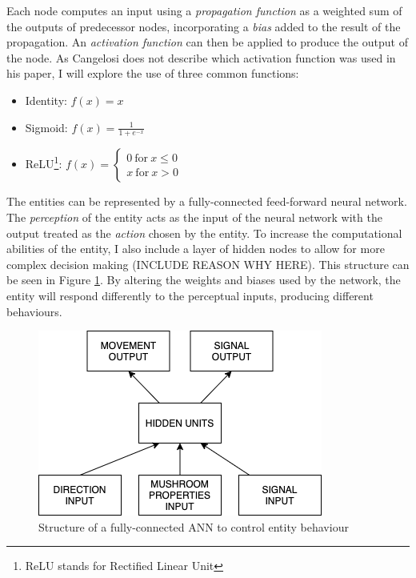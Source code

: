 \documentclass[12pt,a4paper,twoside,openright]{report}
\begin{document}
Each node computes an input using a \emph{propagation function} as a weighted sum of the outputs of predecessor nodes, incorporating a \emph{bias} added to the result of the propagation. An \emph{activation function} can then be applied to produce the output of the node. As Cangelosi does not describe which activation function was used in his paper, I will explore the use of three common functions:

\begin{itemize}
	\item Identity: $f(x) = x$
	\item Sigmoid: $f(x) = \frac{1}{1+e^{-x}}$
	\item ReLU\footnote{ReLU stands for Rectified Linear Unit}:	$ f(x) = 
    \left\{
        \begin{array}{ll}
          0~\mathrm{for}~x \leq 0 \\
          x~\mathrm{for}~x > 0
        \end{array}
      \right.
      $
\end{itemize}

The entities can be represented by a fully-connected feed-forward neural network. The  \emph{perception} of the entity acts as the input of the neural network with the output treated as the \emph{action} chosen by the entity. To increase the computational abilities of the entity, I also include a layer of hidden nodes to allow for more complex decision making (INCLUDE REASON WHY HERE). This structure can be seen in Figure \ref{fig:neuralnet}. By altering the weights and biases used by the network, the entity will respond differently to the perceptual inputs, producing different behaviours. 

\begin{figure}[t]
  \centering
  \includegraphics[width=.6\linewidth]{figs/NeuralNets}
  \caption{Structure of a fully-connected ANN to control entity behaviour}
  \label{fig:neuralnet}
\end{figure}
\end{document}
